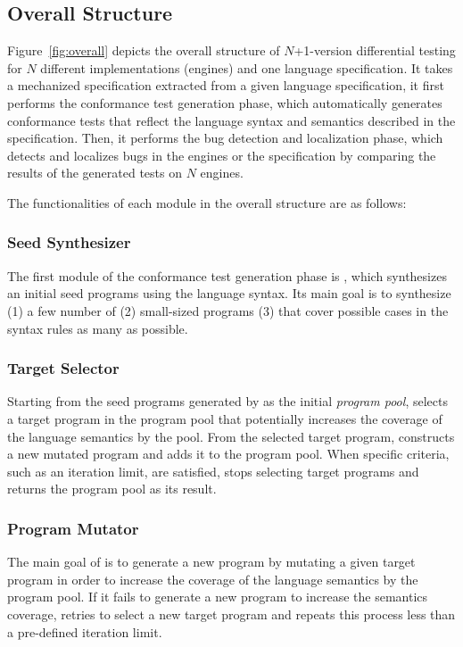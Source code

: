 \subsection{Overall Structure}

Figure~\ref{fig:overall} depicts the overall structure of $N$+1-version differential testing
for $N$ different implementations (engines) and one language specification.
It takes a mechanized specification extracted from a given language
specification, it first performs the conformance test generation phase, which
automatically generates conformance tests that reflect the language
syntax and semantics described in the specification.  Then, it performs the
bug detection and localization phase, which detects and localizes bugs
in the engines or the specification by comparing the results
of the generated tests on $N$ engines.

The functionalities of each module in the overall structure are as follows:

\subsubsection{Seed Synthesizer}
The first module of the conformance test generation phase is ,
which synthesizes an initial seed programs using the language syntax.
Its main goal is to synthesize (1) a few number of
(2) small-sized programs (3) that cover possible cases in the syntax rules as many as possible.

\subsubsection{Target Selector}
Starting from the seed programs generated by 
as the initial \emph{program pool}, 
selects a target program in the program pool that potentially increases the
coverage of the language semantics by the pool.
From the selected target program,  constructs a new mutated program
and adds it to the program pool.  When specific criteria, such as an iteration limit, are satisfied,
 stops selecting target programs and returns
the program pool as its result.

\subsubsection{Program Mutator}
The main goal of  is to generate a new program by
mutating a given target program in order to increase the coverage of
the language semantics by the program pool.
If it fails to generate a new program to increase the semantics coverage,
 retries to select a new target program and repeats this
process less than a pre-defined iteration limit.


